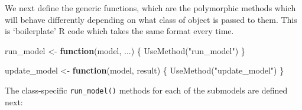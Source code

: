 \documentclass[
]{article}
\newenvironment{Shaded}{\begin{snugshade}}{\end{snugshade}}
\newcommand{\ControlFlowTok}[1]{\textcolor[rgb]{0.00,0.23,0.31}{\textbf{#1}}}
\newcommand{\FunctionTok}[1]{\textcolor[rgb]{0.28,0.35,0.67}{#1}}
\newcommand{\NormalTok}[1]{\textcolor[rgb]{0.00,0.23,0.31}{#1}}
\newcommand{\OtherTok}[1]{\textcolor[rgb]{0.00,0.23,0.31}{#1}}
\newcommand{\StringTok}[1]{\textcolor[rgb]{0.13,0.47,0.30}{#1}}
\begin{document}
We next define the generic functions, which are the polymorphic methods
which will behave differently depending on what class of object is
passed to them. This is `boilerplate' R code which takes the same format
every time.

\begin{Shaded}
\begin{Highlighting}[]
\NormalTok{run\_model }\OtherTok{\textless{}{-}} \ControlFlowTok{function}\NormalTok{(model, ...) \{}
  \FunctionTok{UseMethod}\NormalTok{(}\StringTok{"run\_model"}\NormalTok{)}
\NormalTok{\}}

\NormalTok{update\_model }\OtherTok{\textless{}{-}} \ControlFlowTok{function}\NormalTok{(model, result) \{}
  \FunctionTok{UseMethod}\NormalTok{(}\StringTok{"update\_model"}\NormalTok{)}
\NormalTok{\}}
\end{Highlighting}
\end{Shaded}

The class-specific \texttt{run\_model()} methods for each of the
submodels are defined next:
\end{document}
